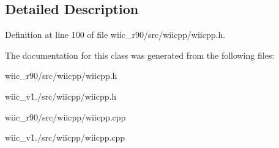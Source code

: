 \subsection{Detailed Description}


Definition at line 100 of file wiic\-\_\-r90/src/wiicpp/wiicpp.\-h.



The documentation for this class was generated from the following files\-:\begin{DoxyCompactItemize}
\item 
wiic\-\_\-r90/src/wiicpp/wiicpp.\-h\item 
wiic\-\_\-v1./src/wiicpp/wiicpp.\-h\item 
wiic\-\_\-r90/src/wiicpp/wiicpp.\-cpp\item 
wiic\-\_\-v1./src/wiicpp/wiicpp.\-cpp\end{DoxyCompactItemize}
